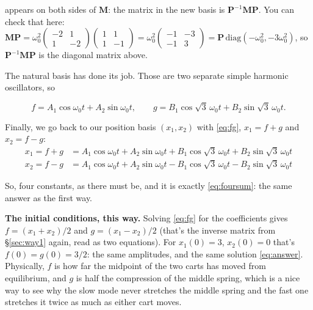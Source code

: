 \documentclass[12pt]{article}
\numberwithin{equation}{section}
\newcommand{\wo}{\omega_0}
\begin{document}
{appears on both sides of $\mathbf{M}$: the matrix in the new basis is
$\mathbf{P}^{-1}\mathbf{M}\mathbf{P}$. You can check that here:
$\mathbf{M}\mathbf{P} = \wo^2
\left(\begin{smallmatrix} -2 & 1 \\ 1 & -2 \end{smallmatrix}\right)
\left(\begin{smallmatrix} 1 & 1 \\ 1 & -1 \end{smallmatrix}\right)
= \wo^2 \left(\begin{smallmatrix} -1 & -3 \\ -1 & 3 \end{smallmatrix}\right)
= \mathbf{P}\,\mathrm{diag}(-\wo^2, -3\wo^2)$, so
$\mathbf{P}^{-1}\mathbf{M}\mathbf{P}$ is the diagonal matrix above.}

The natural basis has done its job. Those are two separate simple
harmonic oscillators, so

\begin{equation}
  f = A_1\cos\wo t + A_2\sin\wo t, \qquad g = B_1\cos\sqrt{3}\,\wo t + B_2\sin\sqrt{3}\,\wo t .
\end{equation}

Finally, we go back to our position basis $(x_1, x_2)$ with
\eqref{eq:fg}, $x_1 = f + g$ and $x_2 = f - g$:
\begin{equation}
  \boxed{\;
  \begin{aligned}
    x_1 = f + g &= A_1\cos\wo t + A_2\sin\wo t + B_1\cos\sqrt{3}\,\wo t + B_2\sin\sqrt{3}\,\wo t \\
    x_2 = f - g &= A_1\cos\wo t + A_2\sin\wo t - B_1\cos\sqrt{3}\,\wo t - B_2\sin\sqrt{3}\,\wo t
  \end{aligned}\;}
\end{equation}

So, four constants, as there must be, and it is exactly
\eqref{eq:foursum}: the same answer as the first way.

\medskip

\noindent\textbf{The initial conditions, this way.} Solving
\eqref{eq:fg} for the coefficients gives $f = (x_1 + x_2)/2$ and $g =
(x_1 - x_2)/2$ (that's the inverse matrix from \S\ref{sec:way1} again,
read as two equations). For $x_1(0) = 3$, $x_2(0) = 0$ that's $f(0) =
g(0) = 3/2$: the same amplitudes, and the same solution
\eqref{eq:answer}. Physically, $f$ is how far the midpoint of the two carts
has moved from equilibrium, and
$g$ is half the compression of the middle spring, which is a nice way to see
why the slow mode never stretches the middle spring and the fast one
stretches it twice as much as either cart moves.
\end{document}
